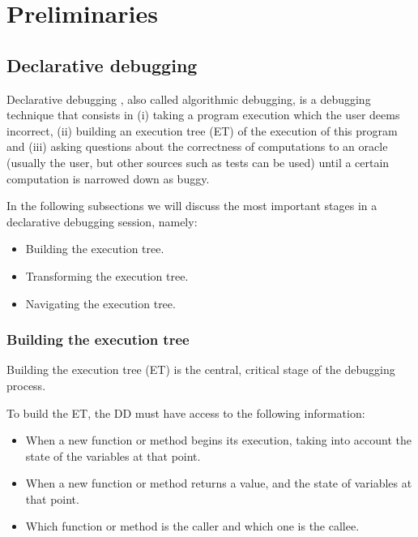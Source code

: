 \chapter{Preliminaries}
\label{cap:preliminares}


\section{Declarative debugging}
Declarative debugging \cite{shapiro1982algorithmic}, also called algorithmic debugging, is a debugging technique that consists in (i) taking a program execution which the user deems incorrect, (ii) building an execution tree (ET) of the execution of this program and (iii) asking questions about the correctness of computations to an oracle (usually the user, but other sources such as tests can be used) until a certain computation is narrowed down as buggy.

In the following subsections we will discuss the most important stages in a declarative debugging session, namely:
\begin{itemize}
    \item Building the execution tree.
    \item Transforming the execution tree.
    \item Navigating the execution tree.
\end{itemize}
\subsection{Building the execution tree}

Building the execution tree (ET) is the central, critical stage of the debugging process.

To build the ET, the DD must have access to the following information:
\begin{itemize}
    \item When a new function or method begins its execution, taking into account the state of the variables at that point. 
    \item When a new function or method returns a value, and the state of variables at that point.
    \item Which function or method is the caller and which one is the callee. 
\end{itemize}

